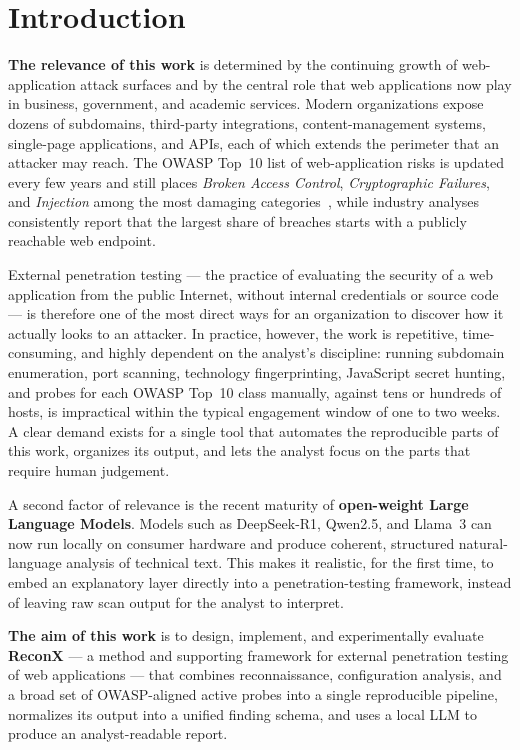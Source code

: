 \chapter{Introduction}
\label{chap:intro}

\textbf{The relevance of this work} is determined by the continuing growth of web-application attack surfaces and by the central role that web applications now play in business, government, and academic services. Modern organizations expose dozens of subdomains, third-party integrations, content-management systems, single-page applications, and APIs, each of which extends the perimeter that an attacker may reach. The OWASP Top~10 list of web-application risks is updated every few years and still places \textit{Broken Access Control}, \textit{Cryptographic Failures}, and \textit{Injection} among the most damaging categories~\cite{owasp_top10}, while industry analyses consistently report that the largest share of breaches starts with a publicly reachable web endpoint.

External penetration testing --- the practice of evaluating the security of a web application from the public Internet, without internal credentials or source code --- is therefore one of the most direct ways for an organization to discover how it actually looks to an attacker. In practice, however, the work is repetitive, time-consuming, and highly dependent on the analyst's discipline: running subdomain enumeration, port scanning, technology fingerprinting, JavaScript secret hunting, and probes for each OWASP Top~10 class manually, against tens or hundreds of hosts, is impractical within the typical engagement window of one to two weeks. A clear demand exists for a single tool that automates the reproducible parts of this work, organizes its output, and lets the analyst focus on the parts that require human judgement.

A second factor of relevance is the recent maturity of \textbf{open-weight Large Language Models}. Models such as DeepSeek-R1, Qwen2.5, and Llama~3 can now run locally on consumer hardware and produce coherent, structured natural-language analysis of technical text. This makes it realistic, for the first time, to embed an explanatory layer directly into a penetration-testing framework, instead of leaving raw scan output for the analyst to interpret.

\textbf{The aim of this work} is to design, implement, and experimentally evaluate \textbf{ReconX} --- a method and supporting framework for external penetration testing of web applications --- that combines reconnaissance, configuration analysis, and a broad set of OWASP-aligned active probes into a single reproducible pipeline, normalizes its output into a unified finding schema, and uses a local LLM to produce an analyst-readable report.

